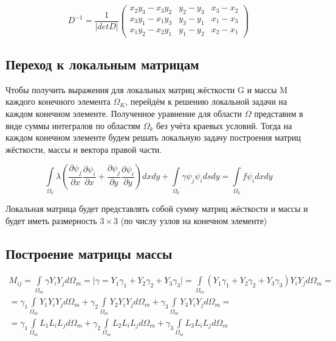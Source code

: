 \documentclass[12pt,a4paper]{article}
\begin{document}
\renewcommand{\arraystretch}{1.25}
\begin{equation*}
    D^{-1} = \frac{1}{\vert det D \vert}
    \begin{pmatrix}
        x_2y_3-x_3y_2 & y_2-y_3 & x_3-x_2 \\
        x_3y_1-x_1y_3 & y_3-y_1 & x_1-x_3 \\
        x_1y_2-x_2y_1 & y_1-y_2 & x_2-x_1
    \end{pmatrix}
\end{equation*}
\renewcommand{\arraystretch}{1.0}

\subsection*{Переход к локальным матрицам}

Чтобы получить выражения для локальных
матриц жёсткости G и массы M каждого
конечного элемента $\Omega_K$, перейдём
к решению локальной задачи на каждом
конечном элементе. Полученное уравнение
для области $\Omega$ представим в виде
суммы интегралов по областям $\Omega_k$
без учёта краевых условий. Тогда на
каждом конечном элементе будем решать
локальную задачу построения матриц
жёсткости, массы и вектора правой части.

$$
\int \limits_{\Omega_k} \lambda
\left(
    \frac{\partial \psi_j}{\partial x}
    \frac{\partial \psi_i}{\partial x}
    +
    \frac{\partial \psi_j}{\partial y}
    \frac{\partial \psi_i}{\partial y}
\right) dxdy
+
\int \limits_{\Omega_k} \gamma \psi_j \psi_i dsdy
=
\int \limits_{\Omega_k} f \psi_i dxdy
$$

\noindent Локальная матрица будет представлять
собой сумму матриц жёсткости и массы и будет
иметь размерность $3 \times 3$ (по числу
узлов на конечном элементе)

\subsection*{Построение матрицы массы}

\begin{eqnarray*}
M_{ij} =
    \int \limits_{\Omega_m} \gamma Y_iY_j d\Omega_m =
    \Big \vert \gamma = Y_1\gamma_1
                      + Y_2\gamma_2
                      + Y_3\gamma_3
    \Big \vert
    =
    \int \limits_{\Omega_m}
        \left(
            Y_1\gamma_1
          + Y_2\gamma_2
          + Y_3\gamma_3
        \right) Y_i Y_j d \Omega_m = \\ =
    \gamma_1 \int \limits_{\Omega_m} Y_1 Y_i Y_j d \Omega_m +
    \gamma_2 \int \limits_{\Omega_m} Y_2 Y_i Y_j d \Omega_m +
    \gamma_3 \int \limits_{\Omega_m} Y_3 Y_i Y_j d \Omega_m = \\ =
    \gamma_1 \int \limits_{\Omega_m} L_1 L_i L_j d \Omega_m +
    \gamma_2 \int \limits_{\Omega_m} L_2 L_i L_j d \Omega_m +
    \gamma_3 \int \limits_{\Omega_m} L_3 L_i L_j d \Omega_m
\end{eqnarray*}
\end{document}
